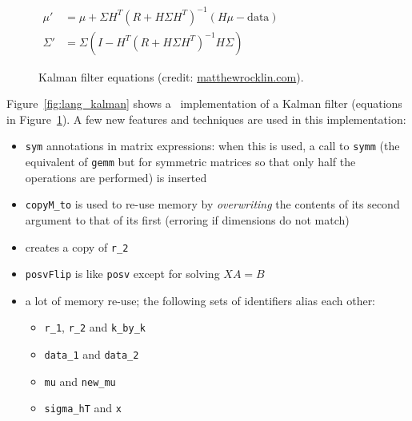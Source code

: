 \begin{figure}[t]
    {\centering
    $  \displaystyle
    \begin{aligned}
        \mu' &= \mu + \Sigma H^T (R + H \Sigma H^T)^{-1} (H \mu - \textrm{data})\\
        \Sigma' &= \Sigma ( I - H^T (R + H \Sigma H^T)^{-1} H \Sigma )
    \end{aligned}
    $ \par}
    \caption{Kalman filter equations (credit:
    \href{http://matthewrocklin.com/blog/work/2012/11/24/Kalman-Filter}{matthewrocklin.com}).}\label{fig:kalman_eqns}
\end{figure}

Figure~\ref{fig:lang_kalman} shows a \lang\ implementation of a Kalman filter
(equations in Figure~\ref{fig:kalman_eqns}). A few new features and techniques
are used in this implementation:
\begin{itemize}

    \item \texttt{sym} annotations in matrix expressions: when this is used, a 
        call to \texttt{symm} (the equivalent of \texttt{gemm} but for
        symmetric matrices so that only half the operations are performed) is
        inserted

    \item \texttt{copyM\_to} is used to re-use memory by \emph{overwriting} the
        contents of its second argument to that of its first (erroring if
        dimensions do not match)

    \item {} creates a copy of \texttt{r\_2}

    \item \texttt{posvFlip} is like \texttt{posv} except for solving $XA = B$

    \item a lot of memory re-use; the following sets of identifiers alias each other:
        \begin{itemize}
            \item \texttt{r\_1}, \texttt{r\_2} and \texttt{k\_by\_k}
            \item \texttt{data\_1} and \texttt{data\_2}
            \item \texttt{mu} and \texttt{new\_mu}
            \item \texttt{sigma\_hT} and \texttt{x}
        \end{itemize}

\end{itemize}

